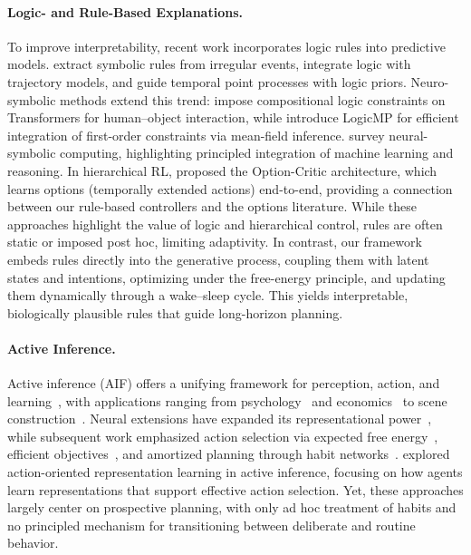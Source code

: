 \documentclass{article} %
\begin{document}
\paragraph{Logic- and Rule-Based Explanations.}
To improve interpretability, recent work incorporates logic rules into predictive models. \citet{li2021explaining} extract symbolic rules from irregular events, \citet{cao2023discovering} integrate logic with trajectory models, and \citet{yangevolving} guide temporal point processes with logic priors. Neuro-symbolic methods extend this trend: \citet{li2023neural} impose compositional logic constraints on Transformers for human–object interaction, while \citet{xu2023logicmp} introduce LogicMP for efficient integration of first-order constraints via mean-field inference. \citet{garcez2019neural} survey neural-symbolic computing, highlighting principled integration of machine learning and reasoning. In hierarchical RL, \citet{bacon2017option} proposed the Option-Critic architecture, which learns options (temporally extended actions) end-to-end, providing a connection between our rule-based controllers and the options literature. While these approaches highlight the value of logic and hierarchical control, rules are often static or imposed post hoc, limiting adaptivity. In contrast, our framework embeds rules directly into the generative process, coupling them with latent states and intentions, optimizing under the free-energy principle, and updating them dynamically through a wake–sleep cycle. This yields interpretable, biologically plausible rules that guide long-horizon planning.

\paragraph{Active Inference.} 
Active inference (AIF) offers a unifying framework for perception, action, and learning~\citep{mazzaglia2022free}, with applications ranging from psychology~\citep{goette2023validation, demekas2020investigation} and economics~\citep{henriksen2020variational} to scene construction~\citep{mirza2016scene, heins2020deep}. Neural extensions have expanded its representational power~\citep{ueltzhoffer2018deep}, while subsequent work emphasized action selection via expected free energy~\citep{friston2016active, friston2015active, friston2021sophisticated, millidge2020relationship}, efficient objectives~\citep{mazzaglia2021contrastive}, and amortized planning through habit networks~\citep{fountas2020deep}. \citet{tschantz2020learning} explored action-oriented representation learning in active inference, focusing on how agents learn representations that support effective action selection. Yet, these approaches largely center on prospective planning, with only ad hoc treatment of habits and no principled mechanism for transitioning between deliberate and routine behavior.
\end{document}
